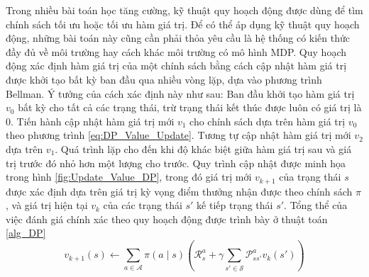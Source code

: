 		Trong nhiều bài toán học tăng cường, kỹ thuật quy hoạch động được dùng để tìm chính sách tối ưu hoặc tối ưu hàm giá trị. Để có thể áp dụng kỹ thuật quy hoạch động, những bài toán này cũng cần phải thỏa yêu cầu là hệ thống có kiến thức đầy đủ về môi trường hay cách khác môi trường có mô hình MDP.
		Quy hoạch động xác định hàm giá trị của một chính sách bằng cách cập nhật hàm giá trị được khởi tạo bất kỳ ban đầu qua nhiều vòng lặp, dựa vào phương trình Bellman. Ý tưởng của cách xác định này như sau: Ban đầu khởi tạo hàm giá trị $v_0$ bất kỳ cho tất cả các trạng thái, trừ trạng thái kết thúc được luôn có giá trị là 0. Tiến hành cập nhật hàm giá trị mới $v_1$ cho chính sách dựa trên hàm giá trị $v_0$ theo phương trình \ref{eq:DP_Value_Update}. Tương tự cập nhật hàm giá trị mới $v_2$ dựa trên $v_1$. Quá trình lặp cho đến khi độ khác biệt giữa hàm giá trị sau và giá trị trước đó nhỏ hơn một lượng cho trước. Quy trình cập nhật được minh họa trong hình \ref{fig:Update_Value_DP}, trong đó giá trị mới $v_{k+1}$ của trạng thái $s$ được xác định dựa trên giá trị kỳ vọng điểm thưởng nhận được theo chính sách $\pi$, và giá trị hiện tại $v_{k}$ của các trạng thái $s'$ kế tiếp trạng thái $s'$. Tổng thể của việc đánh giá chính xác theo quy hoạch động được trình bày ở thuật toán \ref{alg_DP}
		\begin{equation}
			v_{k+1}(s) \leftarrow \sum_{a \in \mathcal{A}}^{}\pi(a \mid s)(\mathcal{R}_{s}^{a} + \gamma \sum_{s' \in \mathcal{S}}^{}\mathcal{P}_{ss'}^{a}v_{k}(s'))
			\label{eq:DP_Value_Update}
		\end{equation}		
